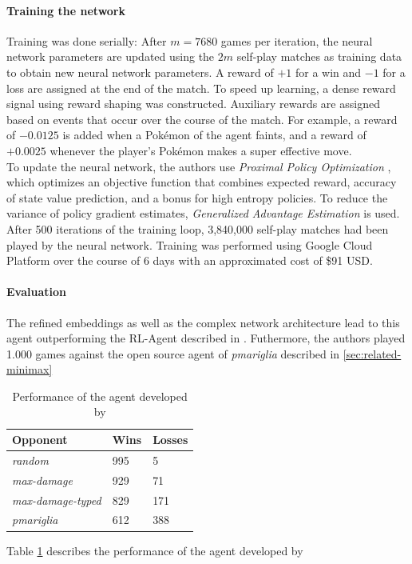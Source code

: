 \paragraph{Training the network}
Training was done serially: After $m = 7680$ games per iteration, the neural network parameters are updated
using the $2m$ self-play matches as training data to obtain new neural network parameters. A reward
of $+1$ for a win and $-1$ for a loss are assigned at the end of the match. To speed up learning, a 
dense reward signal using reward shaping was constructed. Auxiliary rewards are assigned based on
events that occur over the course of the match. For example, a reward of $-0.0125$ is added when a 
Pokémon of the agent faints, and a reward of $+0.0025$ whenever the player's Pokémon makes a 
super effective move. \\
To update the neural network, the authors use \textit{Proximal Policy Optimization} \cite{schulman2017proximal}, which optimizes
an objective function that combines expected reward, accuracy of state value prediction, and a bonus
for high entropy policies. To reduce the variance of policy gradient estimates, \textit{Generalized
Advantage Estimation} \cite{schulman2018highdimensional} is used. \\
After 500 iterations of the training loop, 3,840,000 self-play matches had been played by the neural
network. Training was performed using Google Cloud Platform over the course of 6 days with an 
approximated cost of \$91 USD.

\paragraph{Evaluation}
The refined embeddings as well as the complex network architecture lead to this agent outperforming
the RL-Agent described in \cite{GottaTrainEmAll}. Futhermore, the authors played 1.000 games against
the open source agent of \textit{pmariglia} described in \ref{sec:related-minimax}
\begin{table}[h]
    \centering
        \begin{tabular}{|l|l|l|}
            \hline
            \textbf{Opponent} & \textbf{Wins} & \textbf{Losses} \\
            \hline
            \emph{random} & 995 & 5 \\
            \hline
            \emph{max-damage} & 929 & 71 \\
            \hline
            \emph{max-damage-typed} & 829 & 171 \\
            \hline
            \emph{pmariglia} & 612 & 388 \\
            \hline
        \end{tabular}
        \caption{Performance of the agent developed by \cite{Huang_Lee_2019}}
        \label{tbl:State-Of-The-Art-Results}
\end{table} 
Table \ref{tbl:State-Of-The-Art-Results} describes the performance of the agent developed by
\cite{Huang_Lee_2019}
